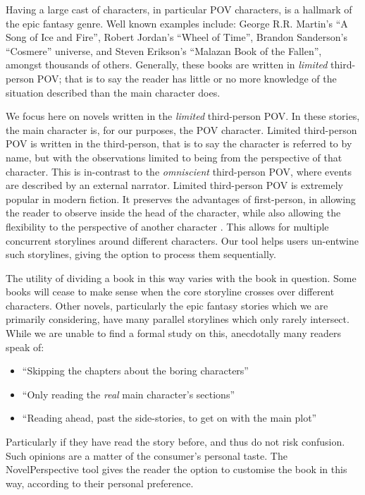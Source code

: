 \documentclass[11pt,a4paper]{article}
\newcommand{\parencite}{\citep}
\begin{document}
Having a large cast of characters, in particular POV characters, is a hallmark of the epic fantasy genre.
Well known examples include: George R.R. Martin's ``A Song of Ice and Fire'', 
Robert Jordan's ``Wheel of Time'', Brandon Sanderson's ``Cosmere'' universe, and
Steven Erikson's ``Malazan Book of the Fallen'', amongst thousands of others.
Generally, these books are written in \emph{limited} third-person POV;
that is to say the reader has little or no more knowledge of the situation described than the main character does.

We focus here on novels written in the \emph{limited} third-person POV.
In these stories, the main character is, for our purposes, the POV character.
Limited third-person POV is written in the third-person, that is to say the character is referred to by name, but with the observations limited to being from the perspective of that character.
This is in-contrast to the \emph{omniscient} third-person POV, where events are described by an external narrator.
Limited third-person POV is extremely popular in modern fiction.
It preserves the advantages of first-person, in allowing the reader to observe inside the head of the character, while also allowing the flexibility to the perspective of another character \parencite{booth2010rhetoric}.
This allows for multiple concurrent storylines around different characters.
Our tool helps users un-entwine such storylines, giving the option to process them sequentially.


The utility of dividing a book in this way varies with the book in question.
Some books will cease to make sense when the core storyline crosses over different characters.
Other novels, particularly the epic fantasy stories which we are primarily considering,
have many parallel storylines which only rarely intersect.
While we are unable to find a formal study on this, 
anecdotally many readers speak of:
\begin{itemize}
	\item ``Skipping the chapters about the boring characters''
	\item ``Only reading the \emph{real} main character's sections''
	\item ``Reading ahead, past the side-stories, to get on with the main plot''	
\end{itemize}
Particularly if they have read the story before, and thus do not risk confusion.
Such opinions are a matter of the consumer's personal taste.
The NovelPerspective tool gives the reader the option to customise the book in this way, according to their personal preference.
\end{document}
